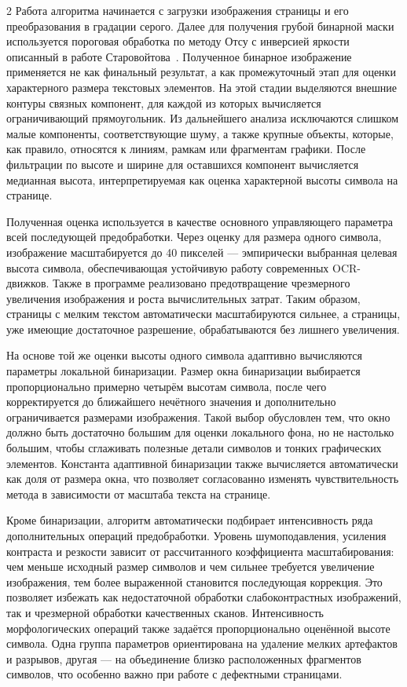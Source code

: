 \documentclass[11pt]{article}
\begin{document}
\begin{multicols}{2}
Работа алгоритма начинается с загрузки изображения страницы и его преобразования в градации серого. Далее для получения грубой бинарной маски используется пороговая обработка по методу Отсу с инверсией яркости описанный в работе Старовойтова~\cite{refStarovoytov}. Полученное бинарное изображение применяется не как финальный результат, а как промежуточный этап для оценки характерного размера текстовых элементов. На этой стадии выделяются внешние контуры связных компонент, для каждой из которых вычисляется ограничивающий прямоугольник. Из дальнейшего анализа исключаются слишком малые компоненты, соответствующие шуму, а также крупные объекты, которые, как правило, относятся к линиям, рамкам или фрагментам графики. После фильтрации по высоте и ширине для оставшихся компонент вычисляется медианная высота, интерпретируемая как оценка характерной высоты символа на странице.

Полученная оценка используется в качестве основного управляющего параметра всей последующей предобработки. Через оценку для размера одного символа, изображение масштабируется до 40 пикселей --- эмпирически выбранная целевая высота символа, обеспечивающая устойчивую работу современных OCR-движков. Также в программе реализовано предотвращение чрезмерного увеличения изображения и роста вычислительных затрат. Таким образом, страницы с мелким текстом автоматически масштабируются сильнее, а страницы, уже имеющие достаточное разрешение, обрабатываются без лишнего увеличения.

На основе той же оценки высоты одного символа адаптивно вычисляются параметры локальной бинаризации. Размер окна бинаризации выбирается пропорционально примерно четырём высотам символа, после чего корректируется до ближайшего нечётного значения и дополнительно ограничивается размерами изображения. Такой выбор обусловлен тем, что окно должно быть достаточно большим для оценки локального фона, но не настолько большим, чтобы сглаживать полезные детали символов и тонких графических элементов. Константа адаптивной бинаризации также вычисляется автоматически как доля от размера окна, что позволяет согласованно изменять чувствительность метода в зависимости от масштаба текста на странице.

Кроме бинаризации, алгоритм автоматически подбирает интенсивность ряда дополнительных операций предобработки. Уровень шумоподавления, усиления контраста и резкости зависит от рассчитанного коэффициента масштабирования: чем меньше исходный размер символов и чем сильнее требуется увеличение изображения, тем более выраженной становится последующая коррекция. Это позволяет избежать как недостаточной обработки слабоконтрастных изображений, так и чрезмерной обработки качественных сканов. Интенсивность морфологических операций также задаётся пропорционально оценённой высоте символа. Одна группа параметров ориентирована на удаление мелких артефактов и разрывов, другая --- на объединение близко расположенных фрагментов символов, что особенно важно при работе с дефектными страницами.


\end{multicols}
\end{document}
